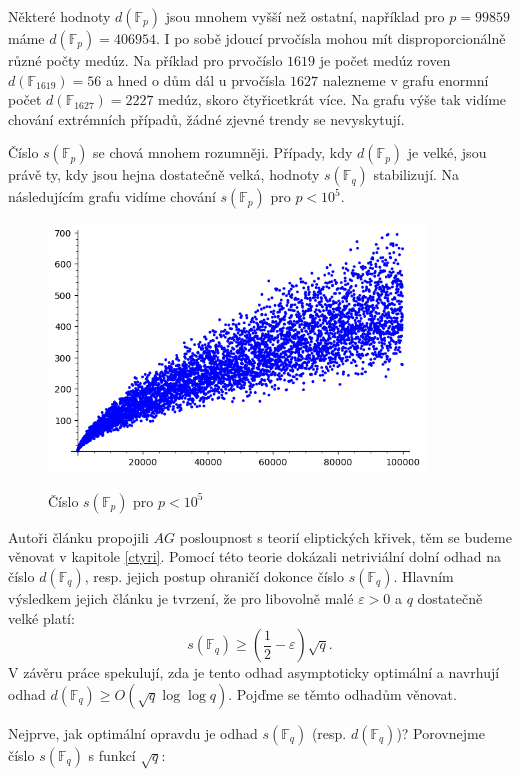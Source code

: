 \documentclass[12pt]{report}
\begin{document}
Některé hodnoty $d(\mathbb{F}_p)$ jsou mnohem vyšší než ostatní, například pro $p=99859$ máme $d(\mathbb{F}_p) = 406954$. I po sobě jdoucí prvočísla mohou mít disproporcionálně různé počty medúz. Na příklad pro prvočíslo $1619$ je počet medúz roven $d(\mathbb{F}_{1619}) = 56$ a hned o dům dál u prvočísla $1627$ nalezneme v grafu enormní počet $d(\mathbb{F}_{1627}) =2227$ medúz, skoro čtyřicetkrát více. Na grafu výše tak vidíme chování extrémních případů, žádné zjevné trendy se nevyskytují. 

Číslo $s(\mathbb{F}_p)$ se chová mnohem rozumněji. Případy, kdy $d(\mathbb{F}_p)$ je velké, jsou právě ty, kdy jsou hejna dostatečně velká, hodnoty $s(\mathbb{F}_q)$ stabilizují. Na následujícím grafu vidíme chování $s(\mathbb{F}_p)$ pro $p<10^5$.\\

\begin{figure}[h]
\centering
  \includegraphics[width=10cm]{SCount.png}
  \label{fig:boat1}
  \caption{Číslo $s(\mathbb{F}_p)$ pro $p < 10^5$}
\end{figure}


Autoři článku \cite{Meduza} propojili $AG$ posloupnost s teorií eliptických křivek, těm se budeme věnovat v kapitole \ref{ctyri}. Pomocí této teorie dokázali netriviální dolní odhad na číslo $d(\mathbb{F}_q)$, resp. jejich postup ohraničí dokonce číslo $s(\mathbb{F}_q)$. Hlavním výsledkem jejich článku je tvrzení, že pro libovolně malé $\varepsilon > 0$ a $q$ dostatečně velké platí:
$$s(\mathbb{F}_q) \geqslant \left( \frac{1}{2} - \varepsilon \right) \sqrt{q}.$$
V závěru práce spekulují, zda je tento odhad asymptoticky optimální a navrhují odhad $d(\mathbb{F}_q) \geqslant O(\sqrt{q} \log \log q)$. Pojďme se těmto odhadům věnovat.

Nejprve, jak optimální opravdu je odhad $s(\mathbb{F}_q)$ (resp. $d(\mathbb{F}_q)$)?  Porovnejme číslo $s(\mathbb{F}_q)$ s funkcí $ \sqrt{q}$:
\end{document}
